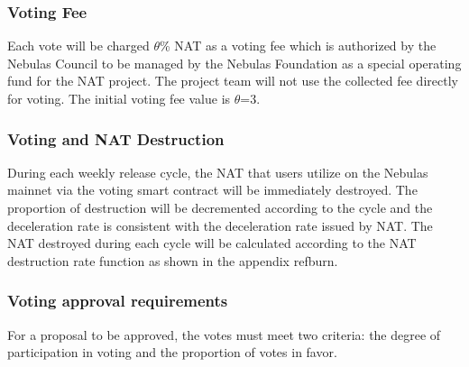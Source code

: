 \subsubsection{Voting Fee}

Each vote will be charged $\theta$\% NAT as a voting fee which is authorized by the Nebulas Council to be managed by the Nebulas Foundation as a special operating fund for the NAT project. The project team will not use the collected fee directly for voting. The initial voting fee value is $\theta$=3.

\subsubsection{Voting and NAT Destruction}

During each weekly release cycle, the NAT that users utilize on the Nebulas mainnet via the voting smart contract will be immediately destroyed. The proportion of destruction will be decremented according to the cycle and the deceleration rate is consistent with the deceleration rate issued by NAT.  The NAT destroyed during each cycle will be calculated according to the NAT destruction rate function as shown in the appendix ref{burn}.

\subsubsection{Voting approval requirements}
	
For a proposal to be approved, the votes must meet two criteria: the degree of participation in voting and the proportion of votes in favor.

